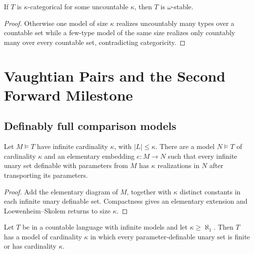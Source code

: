 \begin{theorem}
\label{thm:uncountable-categoricity-implies-omega-stable}
If \(T\) is \(\kappa\)-categorical for some uncountable \(\kappa\), then
\(T\) is \(\omega\)-stable.
\end{theorem}

\begin{proof}
Otherwise one model of size \(\kappa\) realizes uncountably many types
over a countable set while a few-type model of the same size realizes
only countably many over every countable set, contradicting categoricity.
\end{proof}

\section{Vaughtian Pairs and the Second Forward Milestone}

\subsection{Definably full comparison models}

\begin{lemma}
\label{lem:one-step-full-definable-sets}
\leanok
{}
Let \(M\models T\) have infinite cardinality \(\kappa\), with
\(|L|\leq\kappa\).  There are a model \(N\models T\) of cardinality
\(\kappa\) and an elementary embedding \(e:M\to N\) such that every
infinite unary set definable with parameters from \(M\) has
\(\kappa\) realizations in \(N\) after transporting its parameters.
\end{lemma}

\begin{proof}
\leanok
{}
Add the elementary diagram of \(M\), together with \(\kappa\) distinct
constants in each infinite unary definable set.  Compactness gives an
elementary extension and Loewenheim--Skolem returns to size \(\kappa\).
\end{proof}

\begin{proposition}
\label{prop:large-model-no-small-infinite-definable-sets}
\leanok
Let \(T\) be in a countable language with infinite models and let
\(\kappa\geq\aleph_1\).  Then \(T\) has a model of cardinality
\(\kappa\) in which every parameter-definable unary set is finite or has
cardinality \(\kappa\).
\end{proposition}

